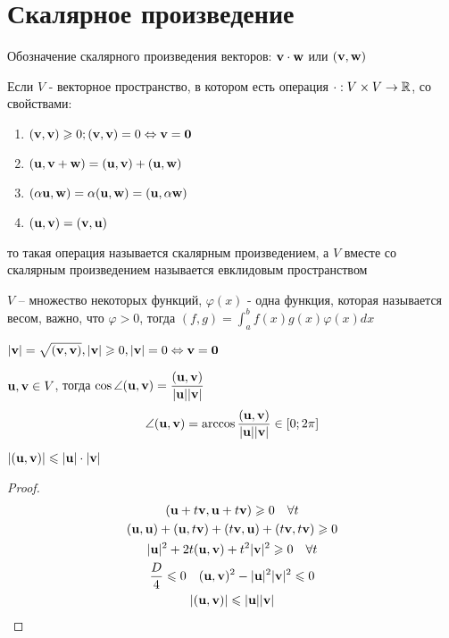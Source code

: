 \documentclass[main]{subfiles}
\begin{document}
\chapter{Скалярное произведение}
Обозначение скалярного произведения векторов: $\mathbf{v} \cdot \mathbf{w}$ или $(\mathbf{v}, \mathbf{w})$

\begin{definition}
    Если $V$ - векторное пространство, в котором есть операция $\cdot : V \times V
        \rightarrow \mathbb{R}$, со свойствами:
    \begin{enumerate}
        \item $(\mathbf{v}, \mathbf{v}) \geqslant0; (\mathbf{v}, \mathbf{v}) = 0 \Leftrightarrow \mathbf{v} = \mathbf{0}$
        \item $(\mathbf{u}, \mathbf{v}+ \mathbf{w}) = (\mathbf{u},\mathbf{v})+ (\mathbf{u},\mathbf{w})$
        \item $(\alpha\mathbf{u}, \mathbf{w}) = \alpha(\mathbf{u}, \mathbf{w}) = (\mathbf{u}, \alpha \mathbf{w})$
        \item $(\mathbf{u},\mathbf{v}) = (\mathbf{v},\mathbf{u})$
    \end{enumerate}
    то такая операция называется скалярным произведением, а $V$ вместе
    со скалярным произведением называется евклидовым пространством
\end{definition}

\begin{example}
    $V$ -- множество некоторых функций, $\varphi(x)$ - одна функция, которая
    называется весом, важно, что $\varphi >0$, тогда $(f,g) = \int_a^b f(x)g(x)\varphi(x)dx$
\end{example}

\begin{definition}
    $|\mathbf{v}| = \sqrt{(\mathbf{v}, \mathbf{v})}, |\mathbf{v}| \geqslant 0, |\mathbf{v}| = 0 \Leftrightarrow \mathbf{v} = \mathbf{0}$
\end{definition}
\begin{definition}
    $\mathbf{u}, \mathbf{v} \in V$, тогда
    $\displaystyle \cos \angle (\mathbf{u}, \mathbf{v}) = \frac{(\mathbf{u},\mathbf{v})}{|\mathbf{u}||\mathbf{v}|}$
    \[\angle(\mathbf{u}, \mathbf{v}) = \arccos \frac{(\mathbf{u},\mathbf{v})}{|\mathbf{u}||\mathbf{v}|} \in [0; 2\pi]\]
\end{definition}

\begin{theorem}
    $|(\mathbf{u},\mathbf{v})| \leqslant |\mathbf{u}| \cdot |\mathbf{v}|$
\end{theorem}
\begin{proof}
    \begin{gather*}
        (\mathbf{u} + t \mathbf{v}, \mathbf{u}+t \mathbf{v}) \geqslant 0 \quad \forall t\\
        (\mathbf{u}, \mathbf{u}) + (\mathbf{u},t \mathbf{v})+(t \mathbf{v}, \mathbf{u}) + (t \mathbf{v}, t \mathbf{v}) \geqslant 0\\
        |\mathbf{u}|^2 + 2t(\mathbf{u},\mathbf{v}) + t^2 |\mathbf{v}|^2 \geqslant 0 \quad \forall t\\
        \frac{D}{4} \leqslant 0 \quad (\mathbf{u},\mathbf{v})^2 - |\mathbf{u}|^2 |\mathbf{v}|^2 \leqslant 0\\
        |(\mathbf{u},\mathbf{v})| \leqslant |\mathbf{u}| |\mathbf{v}|
    \end{gather*}
\end{proof}
\end{document}
